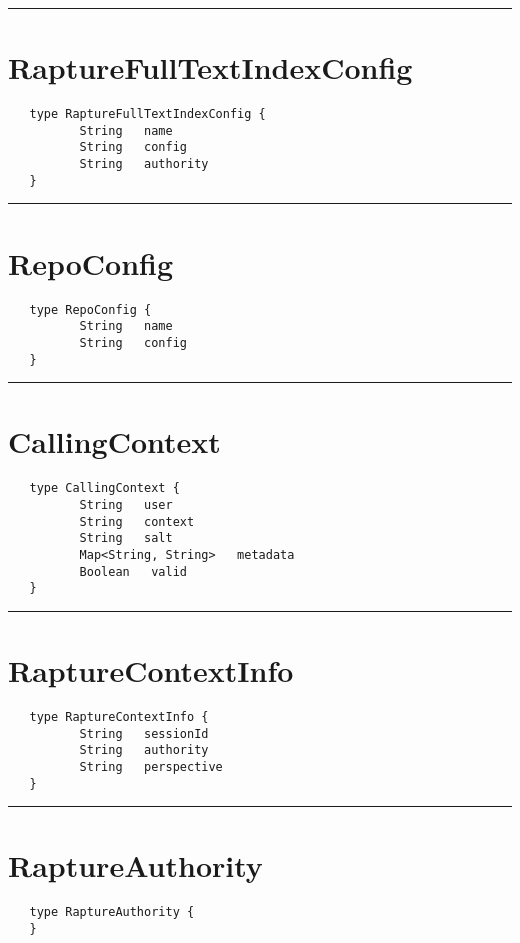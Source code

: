 \rule{15cm}{2pt}
\section{RaptureFullTextIndexConfig}
\label{type:RaptureFullTextIndexConfig}

\begin{verbatim}
   type RaptureFullTextIndexConfig {
          String   name
          String   config
          String   authority
   }
\end{verbatim}

\rule{15cm}{2pt}
\section{RepoConfig}
\label{type:RepoConfig}

\begin{verbatim}
   type RepoConfig {
          String   name
          String   config
   }
\end{verbatim}

\rule{15cm}{2pt}
\section{CallingContext}
\label{type:CallingContext}

\begin{verbatim}
   type CallingContext {
          String   user
          String   context
          String   salt
          Map<String, String>   metadata
          Boolean   valid
   }
\end{verbatim}

\rule{15cm}{2pt}
\section{RaptureContextInfo}
\label{type:RaptureContextInfo}

\begin{verbatim}
   type RaptureContextInfo {
          String   sessionId
          String   authority
          String   perspective
   }
\end{verbatim}

\rule{15cm}{2pt}
\section{RaptureAuthority}
\label{type:RaptureAuthority}

\begin{verbatim}
   type RaptureAuthority {
   }
\end{verbatim}

